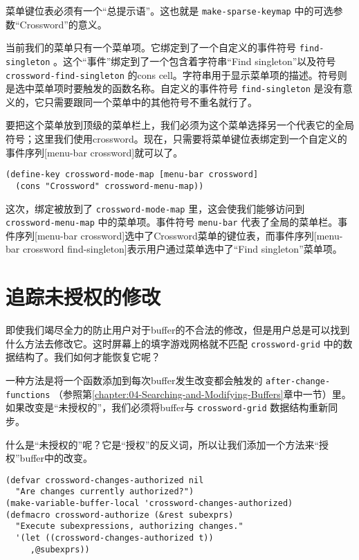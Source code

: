 菜单键位表必须有一个“总提示语”。这也就是 \texttt{make-sparse-keymap} 中的可选参数“Crossword”的意义。

当前我们的菜单只有一个菜单项。它绑定到了一个自定义的事件符号 \texttt{find-singleton} 。这个“事件”绑定到了一个包含着字符串“Find singleton”以及符号 \texttt{crossword-find-singleton} 的cons cell。字符串用于显示菜单项的描述。符号则是选中菜单项时要触发的函数名称。自定义的事件符号 \texttt{find-singleton} 是没有意义的，它只需要跟同一个菜单中的其他符号不重名就行了。

要把这个菜单放到顶级的菜单栏上，我们必须为这个菜单选择另一个代表它的全局符号；这里我们使用crossword。现在，只需要将菜单键位表绑定到一个自定义的事件序列[menu-bar crossword]就可以了。

\begin{verbatim}
(define-key crossword-mode-map [menu-bar crossword]
  (cons "Crossword" crossword-menu-map))
\end{verbatim}

这次，绑定被放到了 \texttt{crossword-mode-map} 里，这会使我们能够访问到 \texttt{crossword-menu-map} 中的菜单项。事件符号 \texttt{menu-bar} 代表了全局的菜单栏。事件序列[menu-bar crossword]选中了Crossword菜单的键位表，而事件序列[menu-bar crossword find-singleton]表示用户通过菜单选中了“Find singleton”菜单项。

\section{追踪未授权的修改}
\label{section:10-Tracking-Unauthorized-Changes}

即使我们竭尽全力的防止用户对于buffer的不合法的修改，但是用户总是可以找到什么方法去修改它。这时屏幕上的填字游戏网格就不匹配 \texttt{crossword-grid} 中的数据结构了。我们如何才能恢复它呢？

一种方法是将一个函数添加到每次buffer发生改变都会触发的 \texttt{after-change-functions} （参照第\ref{chapter:04-Searching-and-Modifying-Buffers}章中一节）里。如果改变是“未授权的”，我们必须将buffer与 \texttt{crossword-grid} 数据结构重新同步。

什么是“未授权的”呢？它是“授权”的反义词，所以让我们添加一个方法来“授权”buffer中的改变。

\begin{verbatim}
(defvar crossword-changes-authorized nil
  "Are changes currently authorized?")
(make-variable-buffer-local 'crossword-changes-authorized)
(defmacro crossword-authorize (&rest subexprs)
  "Execute subexpressions, authorizing changes."
  '(let ((crossword-changes-authorized t))
     ,@subexprs))
\end{verbatim}

